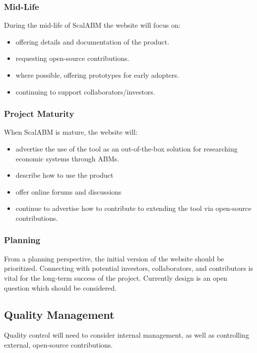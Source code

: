 \documentclass[a4paper]{article}
\begin{document}
\subsubsection{Mid-Life}

During the mid-life of ScalABM the website will focus on:
 
\begin{itemize}
\item offering details and documentation of the product.
\item requesting open-source contributions.
\item where possible, offering prototypes for early adopters.
\item continuing to support collaborators/investors.
\end{itemize}

\subsubsection{Project Maturity}
When ScalABM is mature, the website will:
\begin{itemize}
\item advertise the use of the tool as an out-of-the-box solution for researching economic systems through ABMs.
\item describe how to use the product
\item offer online forums and discussions
\item continue to advertise how to contribute to extending the tool via open-source contributions.
\end{itemize}

\subsubsection{Planning}

From a planning perspective, the initial version of the website should be prioritized. Connecting with potential investors, collaborators, and contributors is vital for the long-term success of the project. Currently design is an open question which should be considered.

\subsection{Quality Management}

Quality control will need to consider internal management, as well as controlling external, open-source contributions.
\end{document}

